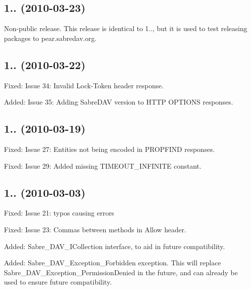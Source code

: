 \subsection*{1.. (2010-\/03-\/23) }


\begin{DoxyItemize}
\item Non-\/public release. This release is identical to 1.., but it is used to test releasing packages to pear.\+sabredav.\+org.
\end{DoxyItemize}

\subsection*{1.. (2010-\/03-\/22) }


\begin{DoxyItemize}
\item Fixed\+: Issue 34\+: Invalid Lock-\/\+Token header response.
\item Added\+: Issue 35\+: Adding Sabre\+D\+AV version to H\+T\+TP O\+P\+T\+I\+O\+NS responses.
\end{DoxyItemize}

\subsection*{1.. (2010-\/03-\/19) }


\begin{DoxyItemize}
\item Fixed\+: Issue 27\+: Entities not being encoded in P\+R\+O\+P\+F\+I\+ND responses.
\item Fixed\+: Issue 29\+: Added missing T\+I\+M\+E\+O\+U\+T\+\_\+\+I\+N\+F\+I\+N\+I\+TE constant.
\end{DoxyItemize}

\subsection*{1.. (2010-\/03-\/03) }


\begin{DoxyItemize}
\item Fixed\+: Issue 21\+: typos causing errors
\item Fixed\+: Issue 23\+: Comma\textquotesingle{}s between methods in Allow header.
\item Added\+: Sabre\+\_\+\+D\+A\+V\+\_\+\+I\+Collection interface, to aid in future compatibility.
\item Added\+: Sabre\+\_\+\+D\+A\+V\+\_\+\+Exception\+\_\+\+Forbidden exception. This will replace Sabre\+\_\+\+D\+A\+V\+\_\+\+Exception\+\_\+\+Permission\+Denied in the future, and can already be used to ensure future compatibility.
\end{DoxyItemize}

